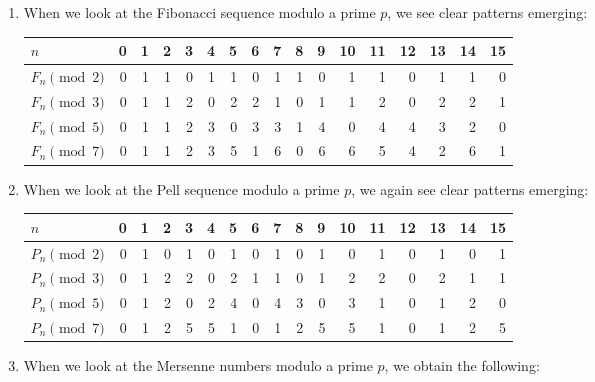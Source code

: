 \begin{example}
  \begin{enumerate}
  \item When we look at the Fibonacci sequence modulo a prime $p$, we see clear patterns emerging:
    \begin{center}
      \renewcommand{\arraystretch}{1.25}
      \begin{tabular}{l|@{\hspace{2\tabcolsep}}*{16}{C}}
        $n$             & 0 & 1 & 2 & 3 & 4 & 5 & 6 & 7 & 8 & 9 & 10 & 11 & 12 & 13 & 14 & 15 \\ \midrule
        $F_n\pmod{2}$ & 0 & 1 & 1 & 0 & 1 & 1 & 0 & 1 & 1 & 0 & 1 & 1 & 0 & 1 & 1 & 0 \\
        $F_n\pmod{3}$ & 0 & 1 & 1 & 2 & 0 & 2 & 2 & 1 & 0 & 1 & 1 & 2 & 0 & 2 & 2 & 1 \\
        $F_n\pmod{5}$ & 0 & 1 & 1 & 2 & 3 & 0 & 3 & 3 & 1 & 4 & 0 & 4 & 4 & 3 & 2 & 0 \\
        $F_n\pmod{7}$ & 0 & 1 & 1 & 2 & 3 & 5 & 1 & 6 & 0 & 6 & 6 & 5 & 4 & 2 & 6 & 1
      \end{tabular}
    \end{center}
  \item When we look at the Pell sequence modulo a prime $p$, we again see clear patterns emerging:
    \begin{center}
      \renewcommand{\arraystretch}{1.25}
      \begin{tabular}{l|@{\hspace{2\tabcolsep}}*{16}{C}}
        $n$             & 0 & 1 & 2 & 3 & 4 & 5 & 6 & 7 & 8 & 9 & 10 & 11 & 12 & 13 & 14 & 15 \\ \midrule
        $P_n\pmod{2}$ & 0 & 1 & 0 & 1 & 0 & 1 & 0 & 1 & 0 & 1 & 0 & 1 & 0 & 1 & 0 & 1 \\
        $P_n\pmod{3}$ & 0 & 1 & 2 & 2 & 0 & 2 & 1 & 1 & 0 & 1 & 2 & 2 & 0 & 2 & 1 & 1 \\
        $P_n\pmod{5}$ & 0 & 1 & 2 & 0 & 2 & 4 & 0 & 4 & 3 & 0 & 3 & 1 & 0 & 1 & 2 & 0 \\
        $P_n\pmod{7}$ & 0 & 1 & 2 & 5 & 5 & 1 & 0 & 1 & 2 & 5 & 5 & 1 & 0 & 1 & 2 & 5
      \end{tabular}
    \end{center}
  \item When we look at the Mersenne numbers modulo a prime $p$, we obtain the following:
    \begin{center}

\end{center}
\end{enumerate}
\end{example}
